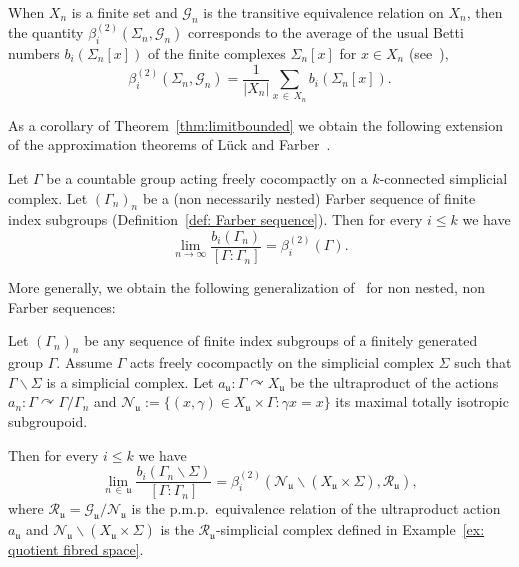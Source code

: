 \documentclass[AHL,Unicode,longabstracts,published]{cedram}
\newcommand{\acting}{\curvearrowright}
\newcommand{\RR}{\mathcal{R}}
\newcommand{\cn}{\mathcal{N}}
\newcommand{\cg}{\mathcal{G}}
\newcommand{\ul}{\mathfrak{u}}
\newcommand{\pmp}{p.m.p.\ }
\begin{document}
When $X_n$ is a finite set and $\cg_n$ is the transitive equivalence relation on $X_n$, then the quantity $\beta^{(2)}_i(\Sigma_n,\cg_n)$ corresponds to the average of the usual Betti numbers $b_i(\Sigma_n[x])$ of the finite complexes $\Sigma_n[x]$ for $x\in X_n$ (see~\cite[Proposition~2.3]{berggab}),
\[
\beta^{(2)}_i\left(\Sigma_n,\cg_n\right)=\frac{1}{|X_n|}\sum_{x\,\in\,X_n} b_i(\Sigma_n[x]).
\]


As a corollary of Theorem~\ref{thm:limitbounded} we obtain the following extension of the approximation theorems of L\"uck and Farber~\cite{Farber-1998-L2-approx,Luc94b}.

\begin{coro}\label{cor:approxgroups}
Let $\Gamma$ be a countable group acting freely cocompactly on a $k$-connected simplicial complex. Let $(\Gamma_n)_n$ be a (non necessarily nested) Farber sequence of finite index subgroups (Definition~\eqref{def: Farber sequence}). Then for every $i\leq k$ we have
\[
\lim\limits_{n\to \infty}\frac{b_i(\Gamma_n)}{[\Gamma:\Gamma_n]}=\beta^{(2)}_i(\Gamma).
\]
\end{coro}

More generally, we obtain the following generalization of~\cite[Théorème~3.1]{berggab} for non nested, non Farber sequences:
\begin{coro}\label{Cor: non Farber sq}
Let $(\Gamma_n)_n$ be any sequence of finite index subgroups of a finitely generated group $\Gamma$. Assume $\Gamma$ acts freely cocompactly on the simplicial complex $\Sigma$ such that $\Gamma\backslash \Sigma$ is a simplicial complex. Let $a_{\ul}:\Gamma\acting X_{\ul}$ be the ultraproduct of the actions $a_n:\Gamma\acting \Gamma/\Gamma_n$ and $\cn_\ul:=\{(x,\gamma)\in X_{\ul}\times \Gamma: \gamma x=x\} $ its maximal totally isotropic subgroupoid.

Then for every $i\leq k$ we have
\[
\lim\limits_{n\,\in\,\ul}\frac{b_i(\Gamma_n\backslash \Sigma)}{[\Gamma:\Gamma_n]}=\beta^{(2)}_i\left(\cn_\ul \backslash \left(X_{\ul}\times \Sigma\right), \RR_{\ul}\right),
\]
where $\RR_\ul=\cg_\ul/\cn_\ul$ is the \pmp equivalence relation of the ultraproduct action $a_\ul$ and $\cn_\ul \backslash \left(X_{\ul}\times \Sigma\right)$ is the $\RR_{\ul}$-simplicial complex defined in Example~\ref{ex: quotient fibred space}.
\end{coro}
\end{document}
